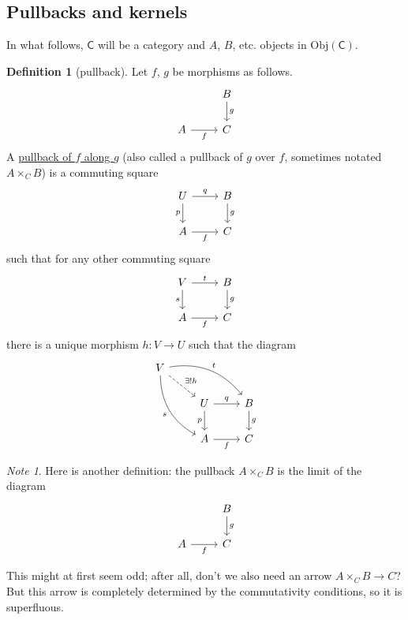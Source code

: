\documentclass[a4paper,10pt]{scrreprt}
\newcommand{\defn}[1]{\ul{#1}}
\newcommand{\Obj}{\mathrm{Obj}}
\theoremstyle{definition}
\newtheorem{definition}{Definition}[section]
\theoremstyle{plain}
\theoremstyle{remark}
\newtheorem{note}{Note}[section]
\begin{document}
\subsection{Pullbacks and kernels}
In what follows, $\mathsf{C}$ will be a category and $A$, $B$, etc. objects in $\Obj(\mathsf{C})$.
\begin{definition}[pullback]
  \label{def:pullback}
  Let $f$, $g$ be morphisms as follows.
  \begin{equation*}
    \begin{tikzcd}
      & B \arrow[d, "g"] \\
      A \arrow[r, swap, "f"] & C
    \end{tikzcd}
  \end{equation*}
  A \defn{pullback of $f$ along $g$} (also called a pullback of $g$ over $f$, sometimes notated $A \times_{C} B$) is a commuting square 
  \begin{equation*}
    \begin{tikzcd}
      U \arrow[r, "q"] \arrow[d, "p", swap] & B \arrow[d, "g"] \\
      A \arrow[r, swap, "f"] & C
    \end{tikzcd}
  \end{equation*}
  such that for any other commuting square
  \begin{equation*}
    \begin{tikzcd}
      V \arrow[r, "t"] \arrow[d, "s", swap] & B \arrow[d, "g"] \\
      A \arrow[r, swap, "f"] & C
    \end{tikzcd}
  \end{equation*}
  there is a unique morphism $h\colon V \to U$ such that the diagram
  \begin{equation*}
    \begin{tikzcd}
      V \arrow[rrd, bend left, "t"] \arrow[rd, dashed, "\exists!h"] \arrow[rdd, bend right, swap, "s"] &   &  \\
      & U \arrow[r, "q"] \arrow[d, swap, "p"] & B \arrow[d, "g"] \\
      & A \arrow[r, swap, "f"] & C
    \end{tikzcd}
  \end{equation*}
\end{definition}
\begin{note}
  Here is another definition: the pullback $A \times_{C} B$ is the limit of the diagram
  \begin{equation*}
    \begin{tikzcd}
      & B
      \arrow[d, "g"]
      \\
      A
      \arrow[r, swap, "f"]
      & C
    \end{tikzcd}
  \end{equation*}

  This might at first seem odd; after all, don't we also need an arrow $A \times_{C} B \to C$? But this arrow is completely determined by the commutativity conditions, so it is superfluous.
\end{note}
\end{document}
